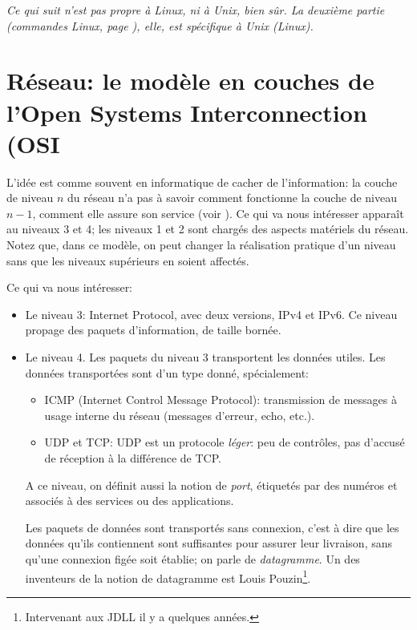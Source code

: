 


\begin{center}
  \begin{minipage}{0.6\textwidth}
    \textsl{Ce qui suit n'est pas propre à Linux, ni à Unix, bien sûr.
      La deuxième partie (commandes Linux, page \pageref{netlinux}),
      elle, est spécifique à Unix 
      (Linux).} 
  \end{minipage}
\end{center}
\section{Réseau: le modèle en couches de l'Open Systems Interconnection
  (OSI}
L'idée est comme souvent en informatique de  cacher de l'information:
la couche de niveau $n$ du réseau n'a pas à savoir comment fonctionne la  couche
de niveau $n-1$, comment elle 
assure son service (voir \cite{OSI}). Ce qui va nous 
intéresser apparaît au niveaux 3 et 4; les niveaux 1 et 2 sont
chargés des aspects matériels du réseau. Notez que, dans ce modèle,
on peut changer la réalisation pratique d'un niveau sans que les
niveaux supérieurs en soient affectés.

Ce qui va nous intéresser:
\begin{itemize}
  \item Le niveau 3: Internet Protocol, avec deux versions, IPv4 et
    IPv6. Ce niveau propage des paquets d'information, de taille bornée.
  \item Le niveau 4. Les paquets du niveau 3 transportent les données
    utiles.  Les
    données transportées sont d'un type donné, spécialement:
    \begin{itemize}
      \item ICMP  (Internet Control Message Protocol): transmission de
        messages à usage interne du réseau (messages d'erreur, echo,
        etc.)\cite{icmp}.
      \item UDP et TCP: UDP\cite{udp} est un protocole
        \emph{léger}: peu de 
        contrôles, pas d'accusé de réception à la différence de TCP\cite{tcp}.
    \end{itemize}
    A ce niveau, on définit aussi la notion de \emph{port}, étiquetés
    par des numéros et associés à des services ou des applications.

    Les paquets de données sont transportés sans connexion, c'est à
    dire que les données qu'ils contiennent sont suffisantes pour
    assurer leur livraison, sans qu'une connexion figée soit établie;
    on parle de \emph{datagramme}\cite{dgram}. Un des inventeurs de la
    notion de datagramme est Louis
    Pouzin\cite{pouzin}\footnote{Intervenant aux JDLL il y a quelques années.}. 
\end{itemize}
